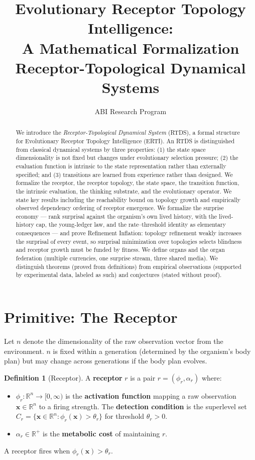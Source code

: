 \documentclass[12pt]{article}
\title{\textbf{Evolutionary Receptor Topology Intelligence:\\
A Mathematical Formalization}\\
\large Receptor-Topological Dynamical Systems}
\author{ABI Research Program}
\date{}
\theoremstyle{definition}
\newtheorem{definition}{Definition}
\begin{document}
\maketitle

\begin{abstract}
We introduce the \textit{Receptor-Topological Dynamical System} (RTDS), a formal structure
for Evolutionary Receptor Topology Intelligence (ERTI). An RTDS is distinguished from
classical dynamical systems by three properties: (1) the state space dimensionality is not
fixed but changes under evolutionary selection pressure; (2) the evaluation function is
intrinsic to the state representation rather than externally specified; and (3) transitions
are learned from experience rather than designed. We formalize the receptor, the receptor
topology, the state space, the transition function, the intrinsic evaluation, the thinking
substrate, and the evolutionary operator. We state key results including the reachability
bound on topology growth and empirically observed dependency ordering of receptor
emergence. We formalize the surprise economy --- rank surprisal against the organism's
own lived history, with the lived-history cap, the young-ledger law, and the
rate--threshold identity as elementary consequences --- and prove Refinement Inflation:
topology refinement weakly increases the surprisal of every event, so surprisal
minimization over topologies selects blindness and receptor growth must be funded by
fitness. We define organs and the organ federation (multiple currencies, one surprise
stream, three shared media). We distinguish theorems (proved from definitions) from
empirical observations (supported by experimental data, labeled as such) and conjectures
(stated without proof).
\end{abstract}

\tableofcontents
\newpage

\section{Primitive: The Receptor}

Let $n$ denote the dimensionality of the raw observation vector from the environment.
$n$ is fixed within a generation (determined by the organism's body plan) but may change
across generations if the body plan evolves.

\begin{definition}[Receptor]
A \textbf{receptor} $r$ is a pair $r = (\phi_r, \alpha_r)$ where:
\begin{itemize}
    \item $\phi_r : \mathbb{R}^n \to [0,\infty)$ is the \textbf{activation function} mapping
    a raw observation $\mathbf{x} \in \mathbb{R}^n$ to a firing strength. The
    \textbf{detection condition} is the superlevel set
    $C_r = \{\mathbf{x} \in \mathbb{R}^n : \phi_r(\mathbf{x}) > \theta_r\}$ for
    threshold $\theta_r > 0$.
    \item $\alpha_r \in \mathbb{R}^+$ is the \textbf{metabolic cost} of maintaining $r$.
\end{itemize}
A receptor fires when $\phi_r(\mathbf{x}) > \theta_r$.
\end{definition}
\end{document}
